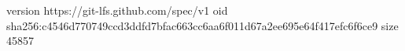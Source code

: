 version https://git-lfs.github.com/spec/v1
oid sha256:c4546d770749ccd3ddfd7bfac663cc6aa6f011d67a2ee695e64f417efc6f6ce9
size 45857

